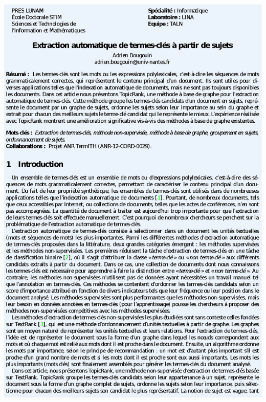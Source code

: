 \documentclass[final, xcolor={usenames, dvipsnames}]{beamer}
\begin{document}
\begin{frame}[b]{}
\begin{columns}[b]
\begin{column}{.45\linewidth}
        \vspace{.25em}

        \begin{columns}
          \begin{column}{.36\linewidth}
            \includegraphics[width=\linewidth]{include/BOUGOUIN_LINA_papier_mod.eps}
            \vspace{12.5em}
          \end{column}\hfill


\end{columns}
\end{column}
\end{columns}
\end{frame}
\end{document}
